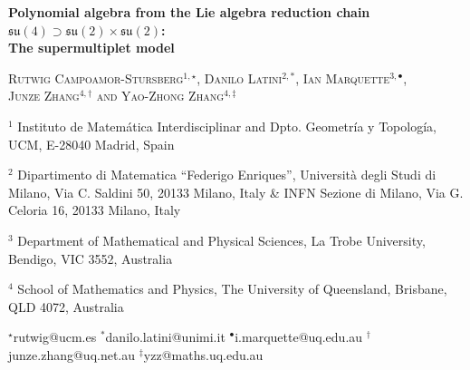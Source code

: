 \documentclass[10pt]{amsart}
\theoremstyle{definition}
\theoremstyle{corollary}
\theoremstyle{remark}
\theoremstyle{conclusion}
\begin{document}
\thispagestyle{empty}


\begin{center}
	\Large{{\bf Polynomial algebra from the Lie algebra reduction chain $\mathfrak{su}(4) \supset \mathfrak{su}(2)  \times \mathfrak{su}(2)$: \\The supermultiplet model }}
\end{center}
\vskip 0.5cm
\begin{center}
	\textsc{Rutwig Campoamor-Stursberg$^{1,\star}$, Danilo Latini$^{2,*}$, Ian Marquette$^{3,\bullet}$,\\ Junze Zhang$^{4,\dagger}$ and Yao-Zhong Zhang$^{4,\ddagger}$}
\end{center}
\vskip 0.2cm
\begin{center}
	$^1$ Instituto de Matem\'{a}tica Interdisciplinar and Dpto. Geometr\'{i}a y Topolog\'{i}a, UCM, E-28040 Madrid, Spain
\end{center}

\begin{center}
	$^2$ Dipartimento di Matematica “Federigo Enriques”, Università degli Studi di Milano, Via C. Saldini 50, 20133 Milano, Italy \& INFN Sezione di Milano, Via G. Celoria 16, 20133 Milano, Italy
\end{center}

\begin{center}
	$^3$ Department of Mathematical and Physical Sciences, La Trobe University, Bendigo, VIC 3552, Australia
\end{center}

\begin{center}
	$^4$ School of Mathematics and Physics, The University of Queensland, Brisbane, QLD 4072, Australia
\end{center}
\begin{center}
	\footnotesize{$^\star$\textsf{rutwig@ucm.es} \hskip 0.25cm$^*$\textsf{danilo.latini@unimi.it} \hskip 0.25cm $^\bullet$\textsf{i.marquette@uq.edu.au} \hskip 0.25cm 
 $^\dagger$\textsf{junze.zhang@uq.net.au} \hskip 0.25cm 
 $^\ddagger$\textsf{yzz@maths.uq.edu.au}}
\end{center}
\vskip  1cm
\hypersetup{colorlinks=true, linkcolor=black}
\end{document}
